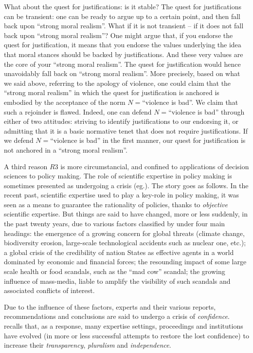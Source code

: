 \documentclass[preprint, french, english, 11pt, authoryear]{elsarticle}%
\begin{document}
What about the quest for justifications: is it stable? The quest for justifications can be transient: one can be ready to argue up to a certain point, and then fall back upon ``strong moral realism''. What if it is not transient -- if it does not fall back upon ``strong moral realism''? One might argue that, if you endorse the quest for justification, it means that you endorse the values underlying the idea that moral stances should be backed by justifications. And these very values are the core of your ``strong moral realism''. The quest for justification would hence unavoidably fall back on ``strong moral realism''. More precisely, based on what we said above, referring to the apology of violence, one could claim that the ``strong moral realism'' in which the quest for justification is anchored is embodied by the acceptance of the norm $N=$``violence is bad''. We claim that such a rejoinder is flawed. Indeed, one can defend $N=$``violence is bad'' through either of two attitudes: striving to identify justifications to our endorsing it, or admitting that it is a basic normative tenet that does not require justifications. If we defend $N=$``violence is bad'' in the first manner, our quest for justification is not anchored in a ``strong moral realism''. 

A third reason $R3$ is more circumstancial, and confined to applications of decision sciences to policy making. The role of scientific expertise in policy making is sometimes presented as undergoing a crisis (eg.\citet{godard_environnement_2015}). The story goes as follows. In the recent past, scientific expertise used to play a key-role in policy making, it was seen as a means to guarantee the rationality of policies, thanks to \emph{objective} scientific expertise. But things are said to have changed, more or less suddenly, in the past twenty years, due to various factors classified by \citet{godard_environnement_2015} under four main headings: the emergence of a growing concern for global threats (climate change, biodiversity erosion, large-scale technological accidents such as nuclear one, etc.); a global crisis of the credibility of nation States as effective agents in a world dominated by economic and financial forces; the resounding impact of some large scale health or food scandals, such as the ``mad cow'' scandal; the growing influence of mass-media, liable to amplify the visibility of such scandals and associated conflicts of interest.

Due to the influence of these factors, experts and their various reports, recommendations and conclusions are said to undergo a crisis of \emph{confidence}. \citet{godard_environnement_2015} recalls that, as a response, many expertise settings, proceedings and institutions have evolved (in more or less successful attempts to restore the lost confidence) to increase their \emph{transparency}, \emph{pluralism} and \emph{independence}.
\end{document}
